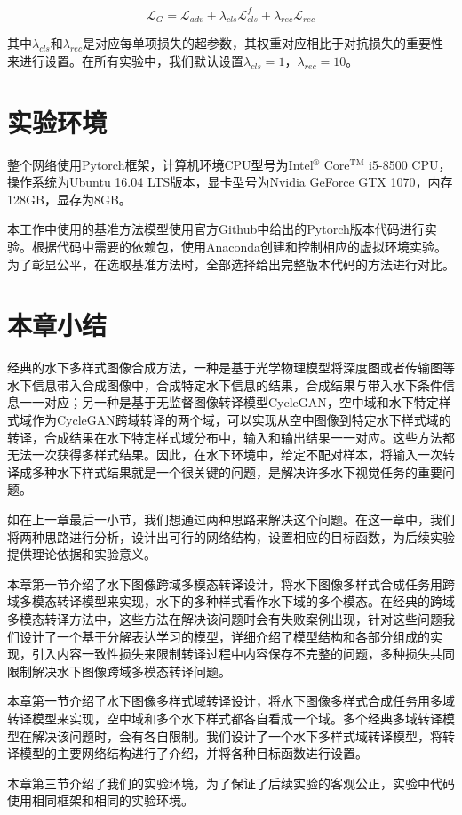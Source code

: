 \begin{equation}
\label{equ:G_exp2}
\mathcal{L}_{G} = \mathcal{L}_{adv}+\lambda_{cls}\mathcal{L}_{cls}^{f}+\lambda_{rec}\mathcal{L}_{rec}
\end{equation}

其中$\lambda_{cls}$和$\lambda_{rec}$是对应每单项损失的超参数，其权重对应相比于对抗损失的重要性来进行设置。在所有实验中，我们默认设置$\lambda_{cls}=1$，$\lambda_{rec}=10$。


\section{实验环境}
整个网络使用Pytorch框架，计算机环境CPU型号为Intel$^\circledR$ Core$^{\text{TM}}$ i5-8500 CPU，操作系统为Ubuntu 16.04 LTS版本，显卡型号为Nvidia GeForce GTX 1070，内存128GB，显存为8GB。

本工作中使用的基准方法模型使用官方Github中给出的Pytorch版本代码进行实验。根据代码中需要的依赖包，使用Anaconda创建和控制相应的虚拟环境实验。为了彰显公平，在选取基准方法时，全部选择给出完整版本代码的方法进行对比。

\section{本章小结}
经典的水下多样式图像合成方法，一种是基于光学物理模型将深度图或者传输图等水下信息带入合成图像中，合成特定水下信息的结果，合成结果与带入水下条件信息一一对应；另一种是基于无监督图像转译模型CycleGAN，空中域和水下特定样式域作为CycleGAN跨域转译的两个域，可以实现从空中图像到特定水下样式域的转译，合成结果在水下特定样式域分布中，输入和输出结果一一对应。这些方法都无法一次获得多样式结果。因此，在水下环境中，给定不配对样本，将输入一次转译成多种水下样式结果就是一个很关键的问题，是解决许多水下视觉任务的重要问题。

如在上一章最后一小节，我们想通过两种思路来解决这个问题。在这一章中，我们将两种思路进行分析，设计出可行的网络结构，设置相应的目标函数，为后续实验提供理论依据和实验意义。

本章第一节介绍了水下图像跨域多模态转译设计，将水下图像多样式合成任务用跨域多模态转译模型来实现，水下的多种样式看作水下域的多个模态。在经典的跨域多模态转译方法中，这些方法在解决该问题时会有失败案例出现，针对这些问题我们设计了一个基于分解表达学习的模型，详细介绍了模型结构和各部分组成的实现，引入内容一致性损失来限制转译过程中内容保存不完整的问题，多种损失共同限制解决水下图像跨域多模态转译问题。

本章第一节介绍了水下图像多样式域转译设计，将水下图像多样式合成任务用多域转译模型来实现，空中域和多个水下样式都各自看成一个域。多个经典多域转译模型在解决该问题时，会有各自限制。我们设计了一个水下多样式域转译模型，将转译模型的主要网络结构进行了介绍，并将各种目标函数进行设置。

本章第三节介绍了我们的实验环境，为了保证了后续实验的客观公正，实验中代码使用相同框架和相同的实验环境。
